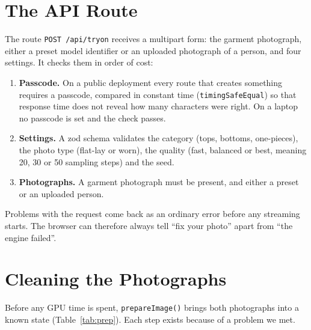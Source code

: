 \section{The API Route}

The route \texttt{POST /api/tryon} receives a multipart form: the garment photograph, either a preset model identifier or an uploaded photograph of a person, and four settings. It checks them in order of cost:

\begin{enumerate}
\item \textbf{Passcode.} On a public deployment every route that creates something requires a passcode, compared in constant time (\texttt{timingSafeEqual}) so that response time does not reveal how many characters were right. On a laptop no passcode is set and the check passes.
\item \textbf{Settings.} A zod schema validates the category (tops, bottoms, one-pieces), the photo type (flat-lay or worn), the quality (fast, balanced or best, meaning 20, 30 or 50 sampling steps) and the seed.
\item \textbf{Photographs.} A garment photograph must be present, and either a preset or an uploaded person.
\end{enumerate}

\noindent Problems with the request come back as an ordinary error before any streaming starts. The browser can therefore always tell ``fix your photo'' apart from ``the engine failed''.

\section{Cleaning the Photographs}

Before any GPU time is spent, \texttt{prepareImage()} brings both photographs into a known state (Table~\ref{tab:prep}). Each step exists because of a problem we met.

